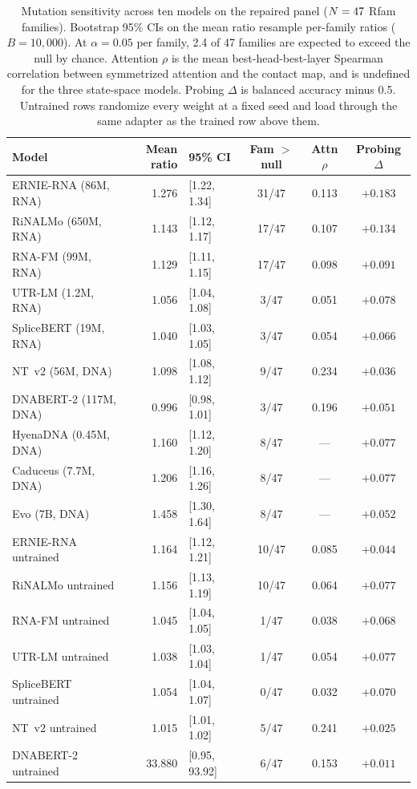 \begin{table}[htbp]
\centering
\caption{Mutation sensitivity across ten models on the repaired panel
($N = 47{}$ Rfam families). Bootstrap 95\% CIs on the mean ratio
resample per-family ratios ($B = 10{,}000$).
At $\alpha = 0.05$ per family, 2.4 of 47
families are expected to exceed the null by chance. Attention $\rho$ is the mean
best-head-best-layer Spearman correlation between symmetrized attention and the
contact map, and is undefined for the three state-space models. Probing $\Delta$
is balanced accuracy minus 0.5. Untrained rows randomize every weight at a fixed
seed and load through the same adapter as the trained row above them.}
\label{tab:rung1}
\small
\begin{tabular}{lrlccc}
\toprule
\textbf{Model} & \textbf{Mean ratio} & \textbf{95\% CI} & \textbf{Fam $>$ null} & \textbf{Attn $\rho$} & \textbf{Probing $\Delta$} \\
\midrule
ERNIE-RNA (86M, RNA)       & 1.276 & [1.22, 1.34] & 31/47 & 0.113 & $+0.183$ \\
RiNALMo (650M, RNA)        & 1.143 & [1.12, 1.17] & 17/47 & 0.107 & $+0.134$ \\
RNA-FM (99M, RNA)          & 1.129 & [1.11, 1.15] & 17/47 & 0.098 & $+0.091$ \\
UTR-LM (1.2M, RNA)         & 1.056 & [1.04, 1.08] & 3/47 & 0.051 & $+0.078$ \\
SpliceBERT (19M, RNA)      & 1.040 & [1.03, 1.05] & 3/47 & 0.054 & $+0.066$ \\
NT~v2 (56M, DNA)           & 1.098 & [1.08, 1.12] & 9/47 & 0.234 & $+0.036$ \\
DNABERT-2 (117M, DNA)      & 0.996 & [0.98, 1.01] & 3/47 & 0.196 & $+0.051$ \\
HyenaDNA (0.45M, DNA)      & 1.160 & [1.12, 1.20] & 8/47 & --- & $+0.077$ \\
Caduceus (7.7M, DNA)       & 1.206 & [1.16, 1.26] & 8/47 & --- & $+0.077$ \\
Evo (7B, DNA)              & 1.458 & [1.30, 1.64] & 8/47 & --- & $+0.052$ \\
\midrule
ERNIE-RNA untrained        & 1.164 & [1.12, 1.21] & 10/47 & 0.085 & $+0.044$ \\
RiNALMo untrained          & 1.156 & [1.13, 1.19] & 10/47 & 0.064 & $+0.077$ \\
RNA-FM untrained           & 1.045 & [1.04, 1.05] & 1/47 & 0.038 & $+0.068$ \\
UTR-LM untrained           & 1.038 & [1.03, 1.04] & 1/47 & 0.054 & $+0.077$ \\
SpliceBERT untrained       & 1.054 & [1.04, 1.07] & 0/47 & 0.032 & $+0.070$ \\
NT~v2 untrained            & 1.015 & [1.01, 1.02] & 5/47 & 0.241 & $+0.025$ \\
DNABERT-2 untrained        & 33.880 & [0.95, 93.92] & 6/47 & 0.153 & $+0.011$ \\
\bottomrule
\end{tabular}
\end{table}
